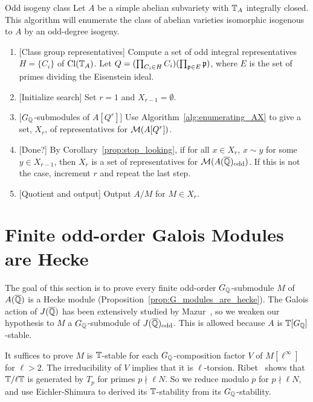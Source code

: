 \documentclass[thesis.tex]{subfiles}
\begin{document}
\begin{algorithm}{Odd isogeny class}%
    \label{alg:odd_isogeny_class}
    Let $A$ be a simple abelian subvariety with $\mathbb{T}_A$ integrally closed. This
    algorithm will enumerate the class of abelian varieties isomorphic
    isogenous to $A$ by an odd-degree isogeny.
    \begin{enumerate}
        \item{} [Class group representatives]
            Compute a set of odd integral representatives $H=\{C_i\}$ of
            $\operatorname{Cl}(\mathbb{T}_A)$. Let $Q = (\prod_{C_i\in H} C_i)(\prod_{\mathfrak{p}\in E} \mathfrak{p})$,
            where $E$ is the set of primes dividing the Eisenstein ideal.
        \item{} [Initialize search]
            Set $r=1$ and $X_{r-1}=\emptyset$.
        \item{} [$G_{\mathbb{Q}}$-submodules of $A[Q^r]$]
            Use Algorithm~\ref{alg:enumerating_AX} to give a set, $X_r$, of
            representatives for $\mathcal{M}(A[Q^r])$.
        \item{} [Done?]
            By Corollary~\ref{prop:stop_looking}, if for all $x\in X_r$, $x\sim
            y$ for some $y\in X_{r-1}$, then $X_r$ is a set of representatives
            for $\mathcal{M}(A(\overline{\mathbb{Q}})_{\mathrm{odd}})$. If this is not the case, increment $r$
            and repeat the last step.
        \item{} [Quotient and output]
            Output $A/M$ for $M\in X_r$.
    \end{enumerate}
\end{algorithm}

\section{Finite odd-order Galois Modules are Hecke}%
\label{sec:finite_odd_order_galois_modules_are_hecke}

The goal of this section is to prove every finite odd-order $G_{\mathbb{Q}}$-submodule $M$
of $A(\overline{\mathbb{Q}})$ is a Hecke module (Proposition~\ref{prop:G_modules_are_hecke}). The
Galois action of $J(\overline{\mathbb{Q}})$ has been extensively studied by
Mazur~\cite{mazur:eisenstein}, so we weaken our hypothesis to $M$ a
$G_{\mathbb{Q}}$-submodule of $J(\overline{\mathbb{Q}})_{\mathrm{odd}}$. This is allowed because $A$ is
$\mathbb{T}[G_{\mathbb{Q}}]$-stable.

It suffices to prove $M$ is $\mathbb{T}$-stable for each $G_{\mathbb{Q}}$-composition factor $V$
of $M[\ell^\infty]$ for $\ell>2$. The irreducibility of $V$ implies that it is
$\ell$-torsion. Ribet~\cite[Proposition 6.1]{ribet:semistable_gal} shows that
$\mathbb{T}/\ell \mathbb{T}$ is generated by $T_p$ for primes $p\nmid \ell N$. So we reduce
modulo $p$ for $p\nmid \ell N$, and use Eichler-Shimura to derived its
$\mathbb{T}$-stability from its $G_{\mathbb{Q}}$-stability.
\end{document}
